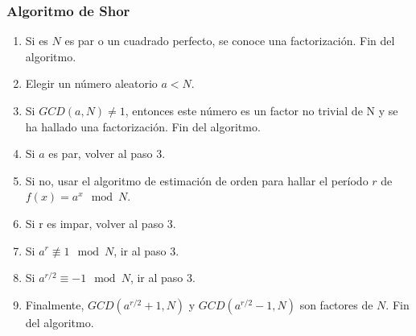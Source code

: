 \documentclass[xetex,mathserif,serif, 8pt]{beamer}
\begin{document}
\begin{frame}
    \frametitle{Algoritmo de Shor}

    \begin{enumerate}
        \item Si es $N$ es par o un cuadrado perfecto, se conoce una factorización. Fin del algoritmo.
        \item Elegir un número aleatorio $a < N$.
        \item Si $GCD(a,N) \neq 1$, entonces este número es un factor no trivial de N y se ha hallado una factorización. Fin del algoritmo.
        \item Si $a$ es par, volver al paso 3.
        \item Si no, usar el algoritmo de estimación de orden para hallar el período $r$ de $f(x) = a^x \mod N$.
        \item Si r es impar, volver al paso 3.
        \item Si $a^{r} \not\equiv 1 \mod N$, ir al paso 3.
        \item Si $a^{r/2} \equiv -1 \mod N$, ir al paso 3.
        \item Finalmente, $GCD(a^{r/2} + 1, N)$ y $GCD(a^{r/2} - 1, N)$ son factores de $N$. Fin del algoritmo.
    \end{enumerate}

\end{frame}
\end{document}

